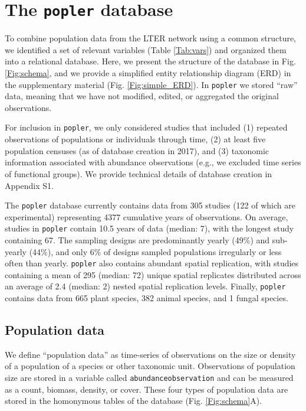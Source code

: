 \documentclass{article}\usepackage[]{graphicx}\usepackage[]{color}
\begin{document}
\section*{The \texttt{popler} database}
To combine population data from the LTER network using a common structure, we identified a set of relevant variables (Table \ref{Tab:vars}) and organized them into a relational database. Here, we present the structure of the database in Fig. \ref{Fig:schema}, and we provide a simplified entity relationship diagram (ERD) in the supplementary material (Fig. \ref{Fig:simple_ERD}). In \texttt{popler} we stored ``raw'' data, meaning that we have not modified, edited, or aggregated the original observations.

For inclusion in \texttt{popler}, we only considered studies that included (1) repeated observations of populations or individuals through time, (2) at least five population censuses (as of database creation in 2017), and (3) taxonomic information associated with abundance observations (e.g., we excluded time series of functional groups). We provide technical details of database creation in Appendix S1.


The \texttt{popler} database currently contains data from 305 studies (122 of which are experimental) representing 4377 cumulative years of observations. On average, studies in \texttt{popler} contain 10.5 years of data (median: 7), with the longest study containing 67. The sampling designs are predominantly yearly (49\%) and sub-yearly (44\%), and only 6\% of designs sampled populations irregularly or less often than yearly. \texttt{popler} also contains abundant spatial replication, with studies containing a mean of 295 (median: 72) unique spatial replicates distributed across an average of 2.4 (median: 2) nested spatial replication levels. Finally, \texttt{popler} contains data from 665 plant species, 382 animal species, and 1 fungal species.


\subsection*{Population data}
We define ``population data'' as time-series of observations on the size or density of a population of a species or other taxonomic unit. Observations of population size are stored in a variable called \texttt{abundance\textunderscore observation} and can be measured as a count, biomass, density, or cover. These four types of population data are stored in the homonymous tables of the database (Fig. \ref{Fig:schema}A).
\end{document}
